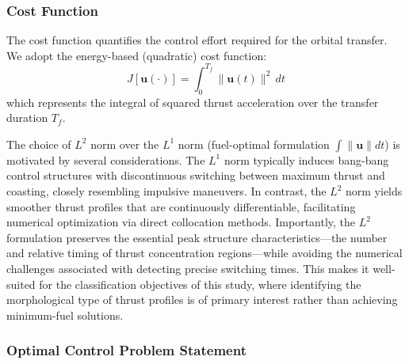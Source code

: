 \documentclass[a4paper,fleqn]{cas-dc}
\begin{document}
\subsubsection{Cost Function}

The cost function quantifies the control effort required for the orbital transfer. We adopt the energy-based (quadratic) cost function:
\begin{equation}\label{eq:cost_function}
J[\mathbf{u}(\cdot)] = \int_0^{T_f} \|\mathbf{u}(t)\|^2 \, dt
\end{equation}
which represents the integral of squared thrust acceleration over the transfer duration $T_f$.

The choice of $L^2$ norm over the $L^1$ norm (fuel-optimal formulation $\int \|\mathbf{u}\| dt$) is motivated by several considerations. The $L^1$ norm typically induces bang-bang control structures with discontinuous switching between maximum thrust and coasting, closely resembling impulsive maneuvers. In contrast, the $L^2$ norm yields smoother thrust profiles that are continuously differentiable, facilitating numerical optimization via direct collocation methods. Importantly, the $L^2$ formulation preserves the essential peak structure characteristics---the number and relative timing of thrust concentration regions---while avoiding the numerical challenges associated with detecting precise switching times. This makes it well-suited for the classification objectives of this study, where identifying the morphological type of thrust profiles is of primary interest rather than achieving minimum-fuel solutions.

\subsubsection{Optimal Control Problem Statement}
\end{document}

